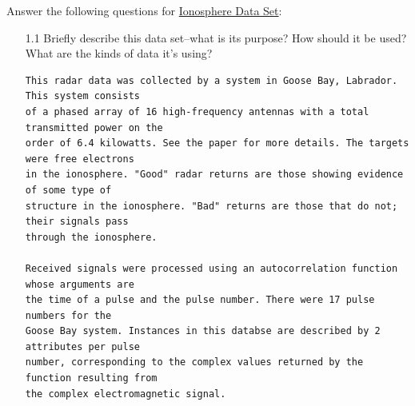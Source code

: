 \documentclass{article}
\begin{document}
 Answer the following questions for  \href{https://archive.ics.uci.edu/ml/datasets/ionosphere}{
Ionosphere Data Set}:
\begin{enumerate}
\item[1.1] Briefly describe this data set--what is its purpose?  How should it be used? What are the kinds of data it's using?
\begin{verbatim}
This radar data was collected by a system in Goose Bay, Labrador. This system consists 
of a phased array of 16 high-frequency antennas with a total transmitted power on the 
order of 6.4 kilowatts. See the paper for more details. The targets were free electrons
in the ionosphere. "Good" radar returns are those showing evidence of some type of 
structure in the ionosphere. "Bad" returns are those that do not; their signals pass 
through the ionosphere. 

Received signals were processed using an autocorrelation function whose arguments are
the time of a pulse and the pulse number. There were 17 pulse numbers for the 
Goose Bay system. Instances in this databse are described by 2 attributes per pulse 
number, corresponding to the complex values returned by the function resulting from 
the complex electromagnetic signal.


\end{verbatim}
\end{enumerate}
\end{document}
